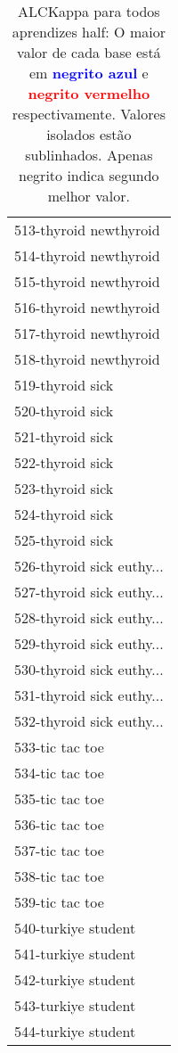 \begin{table}[h]
\caption{ALCKappa para todos aprendizes half: O maior valor de cada base está em \textcolor{blue}{\textbf{negrito azul}} e \textcolor{red}{\textbf{negrito vermelho}} respectivamente. Valores isolados estão sublinhados. Apenas negrito indica segundo melhor valor.}
\begin{center}\begin{tabular}{l}
 & \\ \hline 513-thyroid newthyroid &  \\
514-thyroid newthyroid &  \\
515-thyroid newthyroid &  \\
516-thyroid newthyroid &  \\
517-thyroid newthyroid &  \\
518-thyroid newthyroid &  \\
519-thyroid sick &  \\ \hline
520-thyroid sick &  \\
521-thyroid sick &  \\
522-thyroid sick &  \\
523-thyroid sick &  \\
524-thyroid sick &  \\
525-thyroid sick &  \\
526-thyroid sick euthy... &  \\ \hline
527-thyroid sick euthy... &  \\
528-thyroid sick euthy... &  \\
529-thyroid sick euthy... &  \\
530-thyroid sick euthy... &  \\
531-thyroid sick euthy... &  \\
532-thyroid sick euthy... &  \\
533-tic tac toe &  \\ \hline
534-tic tac toe &  \\
535-tic tac toe &  \\
536-tic tac toe &  \\
537-tic tac toe &  \\
538-tic tac toe &  \\
539-tic tac toe &  \\
540-turkiye student &  \\ \hline
541-turkiye student &  \\
542-turkiye student &  \\
543-turkiye student &  \\
544-turkiye student &  \\\end{tabular}\label{stratsALCKappa16AllReduxb}
\end{center}
\end{table}
